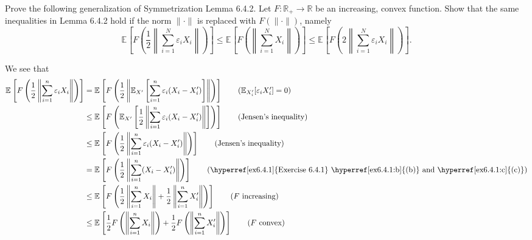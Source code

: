 \begin{problem*}[Exercise 6.4.5]\label{ex6.4.5}
	Prove the following generalization of Symmetrization Lemma 6.4.2. Let \(F \colon \mathbb{R} _+ \to \mathbb{R} \) be an increasing, convex function. Show that the same inequalities in Lemma 6.4.2 hold if the norm \(\lVert \cdot \rVert \) is replaced with \(F(\lVert \cdot \rVert )\), namely
	\[
		\mathbb{E}_{}\left[F \left( \frac{1}{2}\left\lVert \sum_{i=1}^{N} \varepsilon _i X_i \right\rVert \right) \right]
		\leq \mathbb{E}_{}\left[F \left( \left\lVert \sum_{i=1}^{N} X_i \right\rVert \right) \right]
		\leq \mathbb{E}_{}\left[F \left( 2 \left\lVert \sum_{i=1}^{N} \varepsilon _i X_i \right\rVert \right) \right] .
	\]
\end{problem*}
\begin{answer}
	We see that
	\begin{align*}
		\mathbb{E}_{}\left[F \left( \frac{1}{2} \left\lVert \sum_{i=1}^{n} \varepsilon _i X_i \right\rVert  \right) \right]
		 & = \mathbb{E}_{}\left[F \left( \frac{1}{2} \left\lVert \mathbb{E}_{X^{\prime} }\left[\sum_{i=1}^{n} \varepsilon _i (X_i - X_i^{\prime} ) \right] \right\rVert \right) \right] \tag*{(\(\mathbb{E}_{X^{\prime}_i }[\varepsilon _i X_i^{\prime} ] = 0 \))} \\
		 & \leq \mathbb{E}_{}\left[F \left( \mathbb{E}_{X^{\prime} }\left[ \frac{1}{2} \left\lVert \sum_{i=1}^{n} \varepsilon _i (X_i - X_i^{\prime} ) \right\rVert \right] \right) \right] \tag*{(Jensen's inequality)}                                           \\
		 & \leq \mathbb{E}_{}\left[F \left( \frac{1}{2} \left\lVert \sum_{i=1}^{n} \varepsilon _i (X_i - X_i^{\prime} ) \right\rVert \right) \right] \tag*{(Jensen's inequality)}                                                                                  \\
		 & = \mathbb{E}_{}\left[F \left( \frac{1}{2} \left\lVert \sum_{i=1}^{n} (X_i - X_i^{\prime} ) \right\rVert \right) \right] \tag*{(\hyperref[ex6.4.1]{Exercise 6.4.1} \hyperref[ex6.4.1:b]{(b)} and \hyperref[ex6.4.1:c]{(c)})}                             \\
		 & \leq \mathbb{E}_{}\left[F \left( \frac{1}{2} \left\lVert \sum_{i=1}^{n} X_i \right\rVert + \frac{1}{2} \left\lVert \sum_{i=1}^{n} X_i^{\prime} \right\rVert \right) \right] \tag*{(\(F\) increasing)}                                                   \\
		 & \leq \mathbb{E}_{}\left[\frac{1}{2} F \left( \left\lVert \sum_{i=1}^{n} X_i \right\rVert \right) +  \frac{1}{2} F \left( \left\lVert \sum_{i=1}^{n} X_i^{\prime} \right\rVert \right) \right] \tag*{(\(F\) convex)}                                     \\

\end{align*}
\end{answer}
